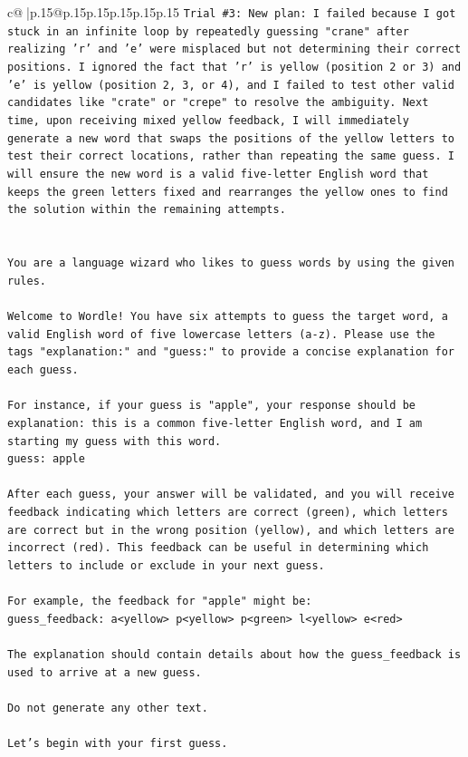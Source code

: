 \documentclass{article}
\begin{document}
{\begin{supertabular}{c@{$\;$}|p{.15\linewidth}@{}p{.15\linewidth}p{.15\linewidth}p{.15\linewidth}p{.15\linewidth}p{.15\linewidth}}
{{{\texttt{Trial \#3: New plan: I failed because I got stuck in an infinite loop by repeatedly guessing "crane" after realizing 'r' and 'e' were misplaced but not determining their correct positions. I ignored the fact that 'r' is yellow (position 2 or 3) and 'e' is yellow (position 2, 3, or 4), and I failed to test other valid candidates like "crate" or "crepe" to resolve the ambiguity. Next time, upon receiving mixed yellow feedback, I will immediately generate a new word that swaps the positions of the yellow letters to test their correct locations, rather than repeating the same guess. I will ensure the new word is a valid five{-}letter English word that keeps the green letters fixed and rearranges the yellow ones to find the solution within the remaining attempts.} \\
\\ 
\\ 
\texttt{You are a language wizard who likes to guess words by using the given rules.} \\
\\ 
\texttt{Welcome to Wordle! You have six attempts to guess the target word, a valid English word of five lowercase letters (a{-}z). Please use the tags "explanation:" and "guess:" to provide a concise explanation for each guess.} \\
\\ 
\texttt{For instance, if your guess is "apple", your response should be} \\
\texttt{explanation: this is a common five{-}letter English word, and I am starting my guess with this word.} \\
\texttt{guess: apple} \\
\\ 
\texttt{After each guess, your answer will be validated, and you will receive feedback indicating which letters are correct (green), which letters are correct but in the wrong position (yellow), and which letters are incorrect (red). This feedback can be useful in determining which letters to include or exclude in your next guess.} \\
\\ 
\texttt{For example, the feedback for "apple" might be:} \\
\texttt{guess\_feedback: a<yellow> p<yellow> p<green> l<yellow> e<red>} \\
\\ 
\texttt{The explanation should contain details about how the guess\_feedback is used to arrive at a new guess.} \\
\\ 
\texttt{Do not generate any other text.} \\
\\ 
\texttt{Let's begin with your first guess.} \\
            }
        }
    }
     \\ \\


\end{supertabular}}
\end{document}
